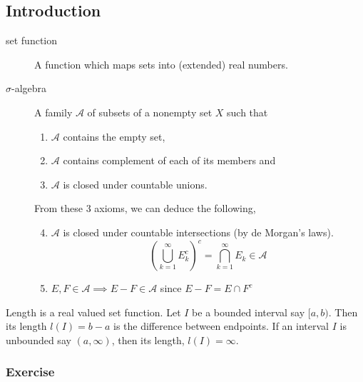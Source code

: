\subsection{Introduction}
\begin{description}
	\item[set function] A function which maps sets into (extended) real numbers.
	\item[$\sigma$-algebra] A family $\mathcal{A}$ of subsets of a nonempty set $X$ such that
	\begin{enumerate}
		\item $\mathcal{A}$ contains the empty set, 
		\item $\mathcal{A}$ contains complement of each of its members and
		\item $\mathcal{A}$ is closed under countable unions.
	\end{enumerate}
	
	From these 3 axioms, we can deduce the following,
	\begin{enumerate}
		\setcounter{enumi}{3}
		\item $\mathcal{A}$ is closed under countable intersections (by de Morgan's laws).
			\[ \left( \bigcup_{k = 1}^\infty E_k^c \right)^c = \bigcap_{k=1}^\infty E_k \in \mathcal{A} \]
		\item $E,F \in \mathcal{A} \implies E-F \in \mathcal{A}$ since $E-F = E \cap F^c$
	\end{enumerate}
\end{description}

\begin{definition}
	Length is a real valued set function.
	Let $I$ be a bounded interval say $[a,b)$.
	Then its length $l(I)=b-a$ is the difference between endpoints.
	If an interval $I$ is unbounded say $(a,\infty)$, then its length, $l(I) = \infty$.
\end{definition}

\subsubsection{Exercise}
